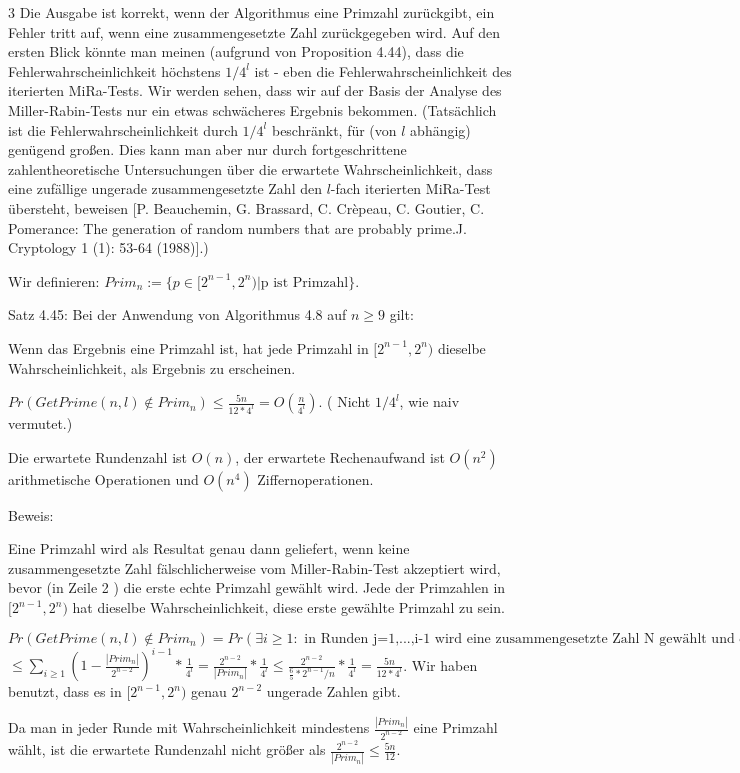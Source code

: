 \documentclass[a4paper]{article}
\begin{document}
\begin{multicols}{3}
        Die Ausgabe ist korrekt, wenn der Algorithmus eine Primzahl zurückgibt, ein Fehler tritt auf, wenn eine zusammengesetzte Zahl zurückgegeben wird. Auf den ersten Blick könnte man meinen (aufgrund von Proposition 4.44), dass die Fehlerwahrscheinlichkeit höchstens $1/4^l$ ist - eben die Fehlerwahrscheinlichkeit des iterierten MiRa-Tests. Wir werden sehen, dass wir auf der Basis der Analyse des Miller-Rabin-Tests nur ein etwas schwächeres Ergebnis bekommen. (Tatsächlich ist die Fehlerwahrscheinlichkeit durch $1/4^l$ beschränkt, für (von $l$ abhängig) genügend großen. Dies kann man aber nur durch fortgeschrittene zahlentheoretische Untersuchungen über die erwartete Wahrscheinlichkeit, dass eine zufällige ungerade zusammengesetzte Zahl den $l$-fach iterierten MiRa-Test übersteht, beweisen [P. Beauchemin, G. Brassard, C. Crèpeau, C. Goutier, C. Pomerance: The generation of random numbers that are probably prime.J. Cryptology 1 (1): 53-64 (1988)].)

        Wir definieren: $Prim_n:=\{p\in [2^{n-1}, 2^n)| \text{p ist Primzahl}\}$.

        Satz 4.45: Bei der Anwendung von Algorithmus 4.8 auf $n\geq 9$ gilt:
        \begin{enumerate*}
            \item Wenn das Ergebnis eine Primzahl ist, hat jede Primzahl in $[2^{n-1}, 2^n)$ dieselbe Wahrscheinlichkeit, als Ergebnis zu erscheinen.
            \item $Pr(GetPrime(n,l)\not\in Prim_n)\leq \frac{5n}{12*4^l}=O(\frac{n}{4^l})$. ( Nicht $1/4^l$, wie naiv vermutet.)
            \item Die erwartete Rundenzahl ist $O(n)$, der erwartete Rechenaufwand ist $O(n^2)$ arithmetische Operationen und $O(n^4)$ Ziffernoperationen.
        \end{enumerate*}

        Beweis:
        \begin{enumerate*}
            \item Eine Primzahl wird als Resultat genau dann geliefert, wenn keine zusammengesetzte Zahl fälschlicherweise vom Miller-Rabin-Test akzeptiert wird, bevor (in Zeile 2 ) die erste echte Primzahl gewählt wird. Jede der Primzahlen in $[2^{n-1}, 2^n)$ hat dieselbe Wahrscheinlichkeit, diese erste gewählte Primzahl zu sein.
            \item $Pr(GetPrime(n,l)\not\in Prim_n)= Pr(\exists i\geq 1 :\text{ in Runden j=1,...,i-1 wird eine zusammengesetzte Zahl N gewählt und erkannt}\wedge\text{in Runde i wird zusammengesetzte Zahl N gewählt und der iterierte MiRa-Test auf N liefert 0})$ $\leq\sum_{i\geq 1} (1 -\frac{|Prim_n|}{2^{n-2}})^{i-1}*\frac{1}{4^l} = \frac{2^{n-2}}{|Prim_n|} *\frac{1}{4^l} \leq \frac{2^{n-2}}{\frac{6}{5} *2^{n-1} /n}*\frac{1}{4^l} = \frac{5n}{12 * 4^l}$. Wir haben benutzt, dass es in $[2^{n-1}, 2^n)$ genau $2^{n-2}$ ungerade Zahlen gibt.
            \item Da man in jeder Runde mit Wahrscheinlichkeit mindestens $\frac{|Prim_n|}{2^{n-2}}$ eine Primzahl wählt, ist die erwartete Rundenzahl nicht größer als $\frac{2^{n-2}}{|Prim_n|} \leq \frac{5n}{12}$.
        \end{enumerate*}


\end{multicols}
\end{document}
